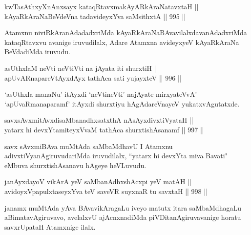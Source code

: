 \begin{shl}
kwTasAthxyXnAnxsayx kataqRtavxmakAyARkAraNatavxtaH || \\
kAyaRkAraNaBeVdeVna tadavideyxYva saMsithxtA \hfill || 995 ||  
\end{shl}

\begin{artha}
Atamxnu niviRkAranAdadadxriMda kAyaRkAraNaBAvavilalxdavanAdadxriMda kataqRtavxvu avanige iruvudilalx, Adare Atamxna avideyxyeV kAyaRkAraNa BeVdadiMda iruvudu.
\end{artha}


\begin{shl}
asUthxlaM neVti neVtiVti na jAyata iti shurxtiH || \\
apUvARnapareVtAyxdAyx tathAca sati yujayxteV \hfill || 996 ||  
\end{shl}

\begin{artha}
`asUthxla manaNu' itAyxdi `neVtineVti' najAyate mirxyateVvA' `apUvaRmanaparamf' itAyxdi shurxtiyu hAgAdareVnayeV yukatxvAgutatxde.
\end{artha}

\begin{shl}
savxsAvxmitAvxdisaMbanadhxsatxthA nAsAyxdivxtiVyataH || \\
yatarx hi devxYtamiteyxVvaM tathAca shurxtishAsanamf \hfill || 997 ||  
\end{shl}

\begin{artha}
savx sAvxmiBAva muMtAda saMbaMdhavU  I Atamxnu adivxtiVyanAgiruvudariMda iruvudilalx, ``yatarx hi devxYta miva Bavati" eMbuva shurxtishAsanavu hAgeye heVLuvudu.
\end{artha}


\begin{shl}
janAyxdayoV vikArA yeV saMbanAdhxshAcxpi yeV matAH || \\
avidoyxVpapulxtaseyxYva teV saveVR suyxnaR tu savxtaH \hfill || 998 ||  
\end{shl}

\begin{artha}
janamx muMtAda yAva BAvavikAragaLu iveyo matutx itara saMbaMdhagaLu aBimatavAgiruvavo, avelalxvU ajAcnxnadiMda piVDitanAgiruvavanige horatu savxrUpataH Atamxnige ilalx.
\end{artha}

